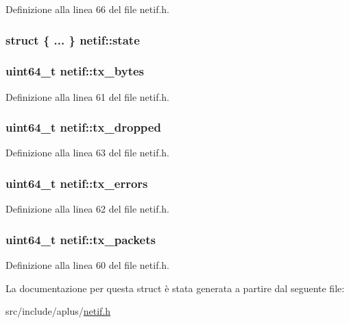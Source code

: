 Definizione alla linea 66 del file netif.\+h.

\hypertarget{structnetif_a5ae2198374cbfd44de7e41e646aaae64}{
\subsubsection[{state}]{\setlength{\rightskip}{0pt plus 5cm}struct \{ ... \}   netif\+::state}}\label{structnetif_a5ae2198374cbfd44de7e41e646aaae64}
\hypertarget{structnetif_ac340647ad948b8103aa9a4e3c7b3fd0f}{
\subsubsection[{tx\+\_\+bytes}]{\setlength{\rightskip}{0pt plus 5cm}uint64\+\_\+t netif\+::tx\+\_\+bytes}}\label{structnetif_ac340647ad948b8103aa9a4e3c7b3fd0f}


Definizione alla linea 61 del file netif.\+h.

\hypertarget{structnetif_a7793287254eb992df0174122a81654d0}{
\subsubsection[{tx\+\_\+dropped}]{\setlength{\rightskip}{0pt plus 5cm}uint64\+\_\+t netif\+::tx\+\_\+dropped}}\label{structnetif_a7793287254eb992df0174122a81654d0}


Definizione alla linea 63 del file netif.\+h.

\hypertarget{structnetif_adac4c9e26ac4c17089eaf3a0e060f601}{
\subsubsection[{tx\+\_\+errors}]{\setlength{\rightskip}{0pt plus 5cm}uint64\+\_\+t netif\+::tx\+\_\+errors}}\label{structnetif_adac4c9e26ac4c17089eaf3a0e060f601}


Definizione alla linea 62 del file netif.\+h.

\hypertarget{structnetif_aabafd7c28253a190863f673bd5e4320a}{
\subsubsection[{tx\+\_\+packets}]{\setlength{\rightskip}{0pt plus 5cm}uint64\+\_\+t netif\+::tx\+\_\+packets}}\label{structnetif_aabafd7c28253a190863f673bd5e4320a}


Definizione alla linea 60 del file netif.\+h.



La documentazione per questa struct è stata generata a partire dal seguente file\+:\begin{DoxyCompactItemize}
\item 
src/include/aplus/\hyperlink{netif_8h}{netif.\+h}\end{DoxyCompactItemize}
